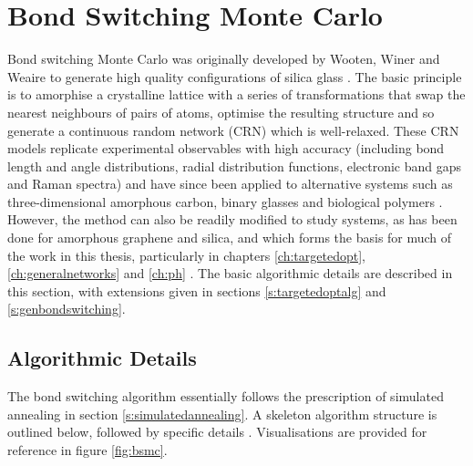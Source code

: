 \section{Bond Switching Monte Carlo}
\label{s:bondswitch}

Bond switching Monte Carlo was originally developed by Wooten, Winer and Weaire to generate high quality configurations of \thd{} silica glass \cite{Wooten1985}.
The basic principle is to amorphise a crystalline lattice with a series of transformations that swap the nearest neighbours of pairs of atoms, optimise the resulting structure and so generate a continuous random network (CRN) which is well\--relaxed.
These CRN models replicate experimental observables with high accuracy (including bond length and angle distributions, radial distribution functions, electronic band gaps and Raman spectra) and have since been applied to alternative systems such as three\--dimensional amorphous carbon, binary glasses and biological polymers \cite{Treacy2012,Tu1998,Djordjevic1995,Mousseau2004,Huisman2008,Broedersz2014}.
However, the method can also be readily modified to study \td{} systems, as has been done for amorphous graphene and silica, and which forms the basis for much of the work in this thesis, particularly in chapters \ref{ch:targetedopt}, \ref{ch:generalnetworks} and \ref{ch:ph} \cite{Kumar2014,Jain2018}.
The basic algorithmic details are described in this section, with extensions given in sections \ref{s:targetedoptalg} and \ref{s:genbondswitching}.

\subsection{Algorithmic Details} 

The \td{} bond switching algorithm essentially follows the prescription of simulated annealing in section \ref{s:simulatedannealing}.
A skeleton algorithm structure is outlined below, followed by specific details \cite{Kumar2012}.
Visualisations are provided for reference in figure \ref{fig:bsmc}.


